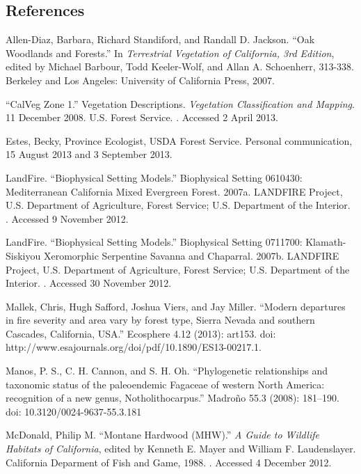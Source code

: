 \subsection*{References}
\begin{hangparas}{.25in}{1} 
Allen-Diaz, Barbara, Richard Standiford, and Randall D. Jackson. ``Oak Woodlands and Forests.'' In \emph{Terrestrial Vegetation of California, 3rd Edition}, edited by Michael Barbour, Todd Keeler-Wolf, and Allan A. Schoenherr, 313-338. Berkeley and Los Angeles: University of California Press, 2007. 

``CalVeg Zone 1.'' Vegetation Descriptions. \emph{Vegetation Classification and Mapping}.  11 December 2008. U.S. Forest Service. . Accessed 2 April 2013.

Estes, Becky, Province Ecologist, USDA Forest Service. Personal communication, 15 August 2013 and 3 September 2013.

LandFire. ``Biophysical Setting Models.'' Biophysical Setting 0610430: Mediterranean California Mixed Evergreen Forest. 2007a. LANDFIRE Project, U.S. Department of Agriculture, Forest Service; U.S. Department of the Interior. . Accessed 9 November 2012.

LandFire. ``Biophysical Setting Models.'' Biophysical Setting 0711700: Klamath-Siskiyou Xeromorphic Serpentine Savanna and Chaparral. 2007b. LANDFIRE Project, U.S. Department of Agriculture, Forest Service; U.S. Department of the Interior. . Accessed 30 November 2012.

Mallek, Chris, Hugh Safford, Joshua Viers, and Jay Miller. ``Modern departures in fire severity and area vary by forest type, Sierra Nevada and southern Cascades, California, USA.'' Ecosphere 4.12 (2013): art153. doi: http://www.esajournals.org/doi/pdf/10.1890/ES13-00217.1. 

Manos, P. S., C. H. Cannon, and S. H. Oh. ``Phylogenetic relationships and taxonomic status of the paleoendemic Fagaceae of western North America: recognition of a new genus, Notholithocarpus.'' Madroño 55.3 (2008): 181–190. doi: 10.3120/0024-9637-55.3.181

McDonald, Philip M. ``Montane Hardwood (MHW).'' \emph{A Guide to Wildlife Habitats of California}, edited by Kenneth E. Mayer and William F. Laudenslayer. California Deparment of Fish and Game, 1988. . Accessed 4 December 2012.


\end{hangparas}
